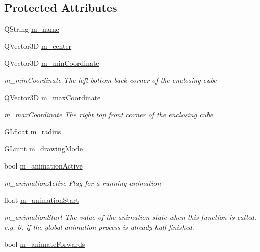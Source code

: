 \subsection*{Protected Attributes}
\begin{DoxyCompactItemize}
\item 
Q\+String \mbox{\hyperlink{class_g_l_body_a348178ac24c376d6ebfe280ce30ff9c4}{m\+\_\+name}}
\item 
Q\+Vector3D \mbox{\hyperlink{class_g_l_body_afffadedad59d067a5fd8cd24d82ab95b}{m\+\_\+center}}
\item 
Q\+Vector3D \mbox{\hyperlink{class_g_l_body_a6151001e1a78005be6ebbbdbf814ffe3}{m\+\_\+min\+Coordinate}}
\begin{DoxyCompactList}\small\item\em m\+\_\+min\+Coordinate The left bottom back corner of the enclosing cube \end{DoxyCompactList}\item 
Q\+Vector3D \mbox{\hyperlink{class_g_l_body_aa92b3be1a0e0f852e7a19ce55fd8c1b1}{m\+\_\+max\+Coordinate}}
\begin{DoxyCompactList}\small\item\em m\+\_\+max\+Coordinate The right top front corner of the enclosing cube \end{DoxyCompactList}\item 
G\+Lfloat \mbox{\hyperlink{class_g_l_body_a96006c2b453ffe0490bee1961e61e3b3}{m\+\_\+radius}}
\item 
G\+Luint \mbox{\hyperlink{class_g_l_body_a3c6c3d3afde4a1990c3cc97976fd5bd8}{m\+\_\+drawing\+Mode}}
\item 
bool \mbox{\hyperlink{class_g_l_body_af93b66b39a57548765d0d134db1ea35a}{m\+\_\+animation\+Active}}
\begin{DoxyCompactList}\small\item\em m\+\_\+animation\+Active Flag for a running animation \end{DoxyCompactList}\item 
float \mbox{\hyperlink{class_g_l_body_a504aa46f6ae7ee454f38bb96c466e561}{m\+\_\+animation\+Start}}
\begin{DoxyCompactList}\small\item\em m\+\_\+animation\+Start The value of the animation state when this function is called. e.\+g. 0. if the global animation process is already half finished. \end{DoxyCompactList}\item 
bool \mbox{\hyperlink{class_g_l_body_ac3a56048c861a5bdd11b344e1e24946b}{m\+\_\+animate\+Forwards}}

\end{DoxyCompactItemize}

